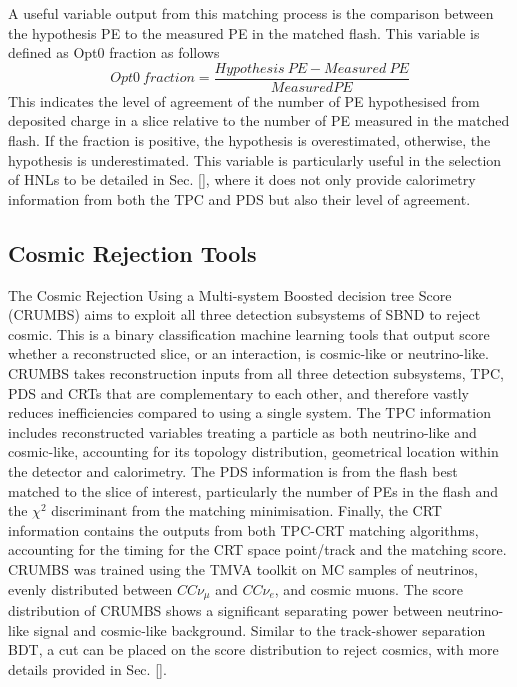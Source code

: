 A useful variable output from this matching process is the comparison between the hypothesis PE to the measured PE in the matched flash.
This variable is defined as Opt0 fraction as follows
\begin{equation}
\label{eq:opt0fraction}
Opt\textit{0}\ fraction = \frac{Hypothesis\ PE - Measured\ PE}{Measured PE}
\end{equation}
This indicates the level of agreement of the number of PE hypothesised from deposited charge in a slice relative to the number of PE measured in the matched flash.
If the fraction is positive, the hypothesis is overestimated, otherwise, the hypothesis is underestimated.
This variable is particularly useful in the selection of HNLs to be detailed in Sec. \ref{}, where it does not only provide calorimetry information from both the TPC and PDS but also their level of agreement.

\subsection{Cosmic Rejection Tools}
\label{sec:crumbs}

The Cosmic Rejection Using a Multi-system Boosted decision tree Score (CRUMBS) aims to exploit all three detection subsystems of SBND to reject cosmic.
This is a binary classification machine learning tools that output score whether a reconstructed slice, or an interaction, is cosmic-like or neutrino-like. 
CRUMBS takes reconstruction inputs from all three detection subsystems, TPC, PDS and CRTs that are complementary to each other, and therefore vastly reduces inefficiencies compared to using a single system.
The TPC information includes reconstructed variables treating a particle as both neutrino-like and cosmic-like, accounting for its topology distribution, geometrical location within the detector and calorimetry.
The PDS information is from the flash best matched to the slice of interest, particularly the number of PEs in the flash and the $\chi^{2}$ discriminant from the matching minimisation.
Finally, the CRT information contains the outputs from both TPC-CRT matching algorithms, accounting for the timing for the CRT space point/track and the matching score.
CRUMBS was trained using the TMVA toolkit \cite{tmva} on MC samples of neutrinos, evenly distributed between $CC\nu_{\mu}$ and $CC\nu_{e}$, and cosmic muons.
The score distribution of CRUMBS shows a significant separating power between neutrino-like signal and cosmic-like background.
Similar to the track-shower separation BDT, a cut can be placed on the score distribution to reject cosmics, with more details provided in Sec. \ref{}.

